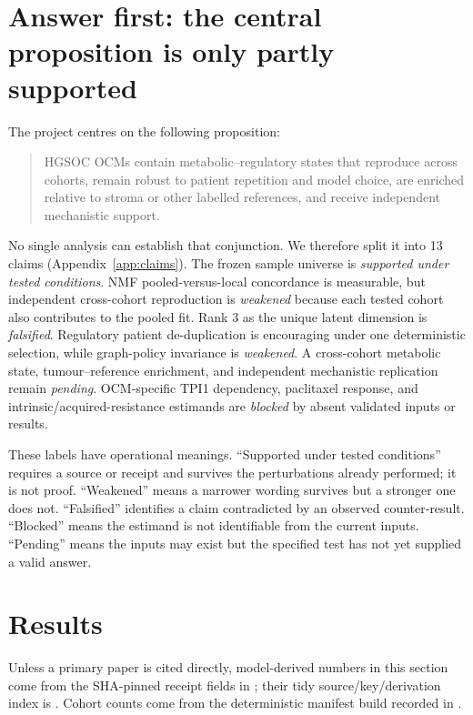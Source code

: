 \documentclass[10pt]{article}
\newcommand{\supported}{\textit{supported under tested conditions}}
\newcommand{\weakened}{\textit{weakened}}
\newcommand{\falsified}{\textit{falsified}}
\newcommand{\blocked}{\textit{blocked}}
\newcommand{\pending}{\textit{pending}}
\begin{document}
\setcounter{tocdepth}{1}
\tableofcontents
\clearpage

\section{Answer first: the central proposition is only partly supported}

The project centres on the following proposition:

\begin{quote}
HGSOC OCMs contain metabolic--regulatory states that reproduce across cohorts,
remain robust to patient repetition and model choice, are enriched relative to
stroma or other labelled references, and receive independent mechanistic
support.
\end{quote}

No single analysis can establish that conjunction.  We therefore split it into
13 claims (Appendix~\ref{app:claims}).  The frozen sample universe is
\supported.  NMF pooled-versus-local concordance is measurable, but independent
cross-cohort reproduction is \weakened{} because each tested cohort also
contributes to the pooled fit.  Rank 3 as the unique latent dimension is
\falsified.  Regulatory patient de-duplication is encouraging under one
deterministic selection, while graph-policy invariance is \weakened.  A
cross-cohort metabolic state, tumour--reference enrichment, and independent
mechanistic replication remain \pending.  OCM-specific TPI1 dependency,
paclitaxel response, and intrinsic/acquired-resistance estimands are \blocked{}
by absent validated inputs or results.

These labels have operational meanings.  ``Supported under tested conditions''
requires a source or receipt and survives the perturbations already performed;
it is not proof.  ``Weakened'' means a narrower wording survives but a stronger
one does not.  ``Falsified'' identifies a claim contradicted by an observed
counter-result.  ``Blocked'' means the estimand is not identifiable from the
current inputs.  ``Pending'' means the inputs may exist but the specified test
has not yet supplied a valid answer.

\section{Results}

Unless a primary paper is cited directly, model-derived numbers in this section
come from the SHA-pinned receipt fields in
; their tidy source/key/derivation
index is .  Cohort counts come from the
deterministic manifest build recorded in
.
\end{document}
